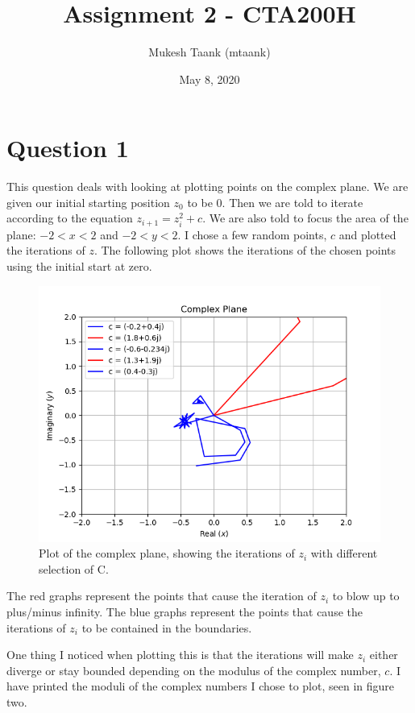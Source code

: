 \documentclass{article}
\title{Assignment 2 - CTA200H}
\author{Mukesh Taank (mtaank)}
\date{May 8, 2020}
\begin{document}
\maketitle

\section*{Question 1}

This question deals with looking at plotting points on the complex plane. 
We are given our initial starting position $z_0$ to be 0.
Then we are told to iterate according to the equation $z_{i + 1} = z_i^2 + c$.
We are also told to focus the area of the plane: $-2 < x < 2$ and $-2 < y < 2$.
I chose a few random points, $c$ and plotted the iterations of $z$.
The following plot shows the iterations of the chosen points using the initial start at zero.

\begin{figure}[!ht]
    \centering
    \includegraphics[scale=0.9]{Q1_plot1.png}
    \caption{Plot of the complex plane, showing the iterations of $z_i$ with different selection of C.}
    \label{fig:Q1_plot1.png}
\end{figure}

The red graphs represent the points that cause the iteration of $z_i$ to blow up to plus/minus infinity. 
The blue graphs represent the points that cause the iterations of $z_i$ to be contained in the boundaries.

One thing I noticed when plotting this is that the iterations will make $z_i$ either diverge or stay bounded depending on the modulus of the complex number, $c$.
I have printed the moduli of the complex numbers I chose to plot, seen in figure two.
\end{document}
